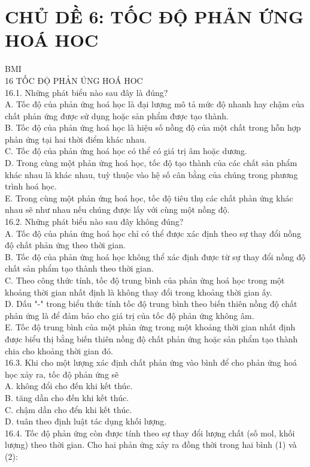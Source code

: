 \documentclass[10pt]{article}
\begin{document}
\section*{CHỦ DỀ 6: TỐC ĐỘ PHẢN ỨNG HOÁ HOC}
BMI\\
16 TỐC ĐỘ PHẢN ÚNG HOÁ HOC\\
16.1. Những phát biểu nào sau đây là đúng?\\
A. Tốc độ của phản ứng hoá học là đại lượng mô tả mức độ nhanh hay chậm của chất phản ứng được sử dụng hoặc sản phẩm được tạo thành.\\
B. Tốc độ của phản ứng hoá học là hiệu số nồng độ của một chất trong hỗn hợp phản ứng tại hai thời điểm khác nhau.\\
C. Tốc độ của phản ứng hoá học có thể có giá trị âm hoặc dương.\\
D. Trong cùng một phản ứng hoá học, tốc độ tạo thành của các chất sản phẩm khác nhau là khác nhau, tuỳ thuộc vào hệ số cân bằng của chúng trong phương trình hoá học.\\
E. Trong cùng một phản ứng hoá học, tốc độ tiêu thụ các chất phản ứng khác nhau sẽ như nhau nếu chúng được lấy với cùng một nồng độ.\\
16.2. Những phát biểu nào sau đây không đúng?\\
A. Tốc độ của phản ứng hoá học chỉ có thể được xác định theo sự thay đổi nồng độ chất phản ứng theo thời gian.\\
B. Tốc độ của phản ứng hoá học không thể xác định được từ sự thay đổi nồng độ chất sản phẩm tạo thành theo thời gian.\\
C. Theo công thức tính, tốc độ trung bình của phản ứng hoá học trong một khoảng thời gian nhất định là không thay đổi trong khoảng thời gian ấy.\\
D. Dấu "-" trong biểu thức tính tốc độ trung bình theo biến thiên nồng độ chất phản ứng là để đảm bảo cho giá trị của tốc độ phản ứng không âm.\\
E. Tốc độ trung bình của một phản ứng trong một khoảng thời gian nhất định được biểu thị bằng biến thiên nồng độ chất phản ứng hoặc sản phẩm tạo thành chia cho khoảng thời gian đó.\\
16.3. Khi cho một lượng xác định chất phản ứng vào bình để cho phản ứng hoá học xảy ra, tốc độ phản ứng sẽ\\
A. không đổi cho đến khi kết thúc.\\
B. tăng dần cho đến khi kết thúc.\\
C. chậm dần cho đển khi kết thúc.\\
D. tuân theo định luật tác dụng khối lượng.\\
16.4. Tốc độ phản ứng còn được tính theo sự thay đổi lượng chất (số mol, khối lượng) theo thời gian. Cho hai phản ứng xảy ra đồng thời trong hai bình (1) và (2):
\end{document}
